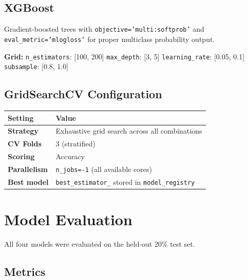 \documentclass[12pt,a4paper]{article}
\begin{document}
\subsection{XGBoost}

Gradient-boosted trees with \texttt{objective='multi:softprob'} and
\texttt{eval\_metric='mlogloss'} for proper multiclass probability output.

\textbf{Grid:} \texttt{n\_estimators}: [100, 200] \quad
\texttt{max\_depth}: [3, 5] \quad
\texttt{learning\_rate}: [0.05, 0.1] \quad
\texttt{subsample}: [0.8, 1.0]

\subsection{GridSearchCV Configuration}

\begin{center}
\begin{tabular}{>{\bfseries}p{3.5cm} p{9cm}}
  \toprule
  \textbf{Setting} & \textbf{Value} \\
  \midrule
  Strategy     & Exhaustive grid search across all combinations \\
  CV Folds     & 3 (stratified) \\
  Scoring      & Accuracy \\
  Parallelism  & \texttt{n\_jobs=-1} (all available cores) \\
  Best model   & \texttt{best\_estimator\_} stored in \texttt{model\_registry} \\
  \bottomrule
\end{tabular}
\end{center}

\newpage

\section{Model Evaluation}

All four models were evaluated on the held-out 20\% test set.

\subsection{Metrics}
\end{document}
